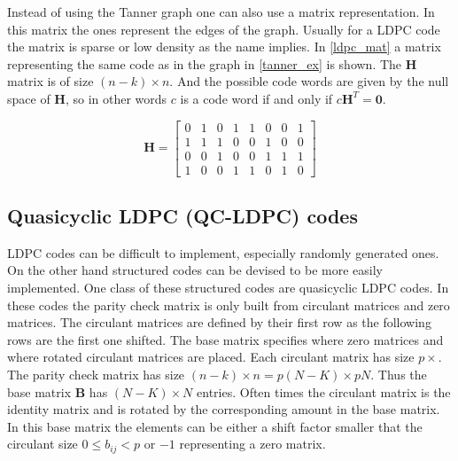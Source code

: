 Instead of using the Tanner graph one can also use a matrix representation. In this matrix the ones represent the edges of the graph. Usually for a LDPC code the matrix is sparse or low density as the name implies. In \cref{ldpc_mat} a matrix representing the same code as in the graph in \cref{tanner_ex} is shown. The $\bm{H}$ matrix is of size $(n-k) \times n$. And the possible code words are given by the null space of $\bm{H}$, so in other words $c$ is a code word if and only if $c\bm{H}^T = \bm{0}$\cite{RiUr01}.


\begin{equation}
	\bm{H} = \left[\begin{matrix}
		0 & 1 & 0 & 1 & 1 & 0 & 0 & 1 \\ 
		1 & 1 & 1 & 0 & 0 & 1 & 0 & 0 \\
		0 & 0 & 1 & 0 & 0 & 1 & 1 & 1 \\
		1 & 0 & 0 & 1 & 1 & 0 & 1 & 0
	\end{matrix}\right] \label{ldpc_mat}
\end{equation}

\subsection{Quasicyclic LDPC (QC-LDPC) codes} \label{qc_ldpc}
LDPC codes can be difficult to implement, especially randomly generated ones. On the other hand structured codes can be devised to be more easily implemented. One class of these structured codes are quasicyclic LDPC codes. In these codes the parity check matrix is only built from circulant matrices and zero matrices\cite{Fo04}. The circulant matrices are defined by their first row as the following rows are the first one shifted. The base matrix specifies where zero matrices and where rotated circulant matrices are placed. Each circulant matrix has size $p\times$. The parity check matrix has size $(n-k) \times n = p (N - K) \times p N$. Thus the base matrix $\bm{B}$ has $(N - K) \times N$ entries. Often times the circulant matrix is the identity matrix and is rotated by the corresponding amount in the base matrix. In this base matrix the elements can be either a shift factor smaller that the circulant size $0 \leq b_{ij} < p$ or $-1$ representing a zero matrix.

